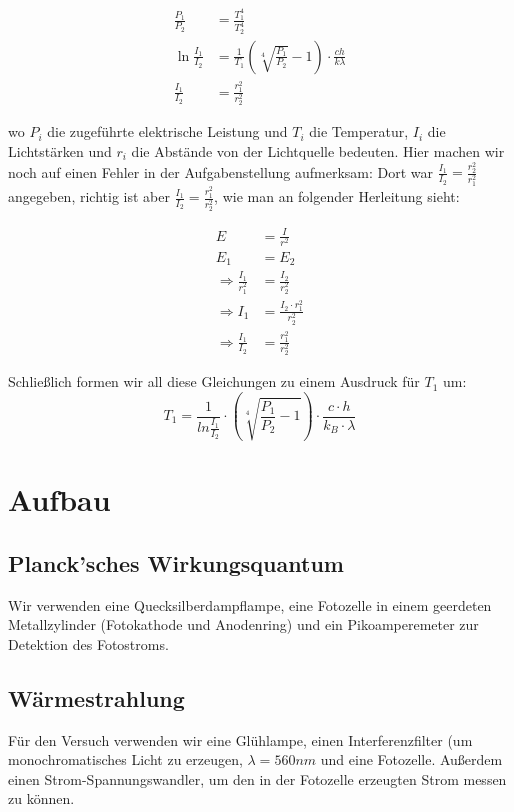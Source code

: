 \documentclass[12pt]{article}
\begin{document}
\begin{align}
\label{waermetheorie}
\frac{P_1}{P_2}& = \frac{T_1^4}{T_2^4} \\
\ln \frac{I_1}{I_2} &= \frac{1}{T_1} \left(\sqrt[4]{\frac{P_1}{P_2}}-1\right) \cdot \frac{ch}{k\lambda} \\
\frac{I_1}{I_2} &= \frac{r_1^2}{r_2^2}
\label{waermeende}
\end{align}

wo $P_i$ die zugeführte elektrische Leistung und $T_i$ die Temperatur, 
$I_i$ die Lichtstärken und $r_i$ die Abstände von der Lichtquelle bedeuten.
Hier machen wir noch auf einen Fehler in der Aufgabenstellung aufmerksam: Dort war $\frac{I_1}{I_2} = \frac{r_2^2}{r_1^2}$ angegeben, richtig ist aber $\frac{I_1}{I_2} = \frac{r_1^2}{r_2^2}$, wie man an folgender Herleitung sieht:


\begin{align*}
E&=\frac{I}{r^2}\\
E_1&= E_ 2 \\
\Rightarrow \frac{I_1}{r_1^2}&= \frac{I_2}{r_2^2} \\
\Rightarrow I_1&= \frac{I_2 \cdot \textbf{$r_1^2$}}{r_2^2} \\
\Rightarrow \frac{I_1}{I_2}&= \frac{r_1^2}{r_2^2}
\end{align*}

Schließlich formen wir all diese Gleichungen zu einem Ausdruck für $T_1$ um:
\begin{equation}
T_1=\frac{1}{ln \frac{I_1}{I_2}}\cdot \left( \sqrt[4]{\frac{P_1}{P_2}-1} \right) \cdot \frac{c\cdot h}{k_B\cdot \lambda}
\end{equation} 
\section{Aufbau}
\subsection{Planck'sches Wirkungsquantum}
Wir verwenden eine Quecksilberdampflampe, eine Fotozelle in einem geerdeten Metallzylinder (Fotokathode und Anodenring) und ein Pikoamperemeter zur Detektion des Fotostroms.

\subsection{Wärmestrahlung}
Für den Versuch verwenden wir eine Glühlampe, einen Interferenzfilter (um monochromatisches Licht zu erzeugen, $\lambda=560\si{nm}$ und eine Fotozelle. Außerdem einen Strom-Spannungswandler, um den in der Fotozelle erzeugten Strom messen zu können.
\end{document}
